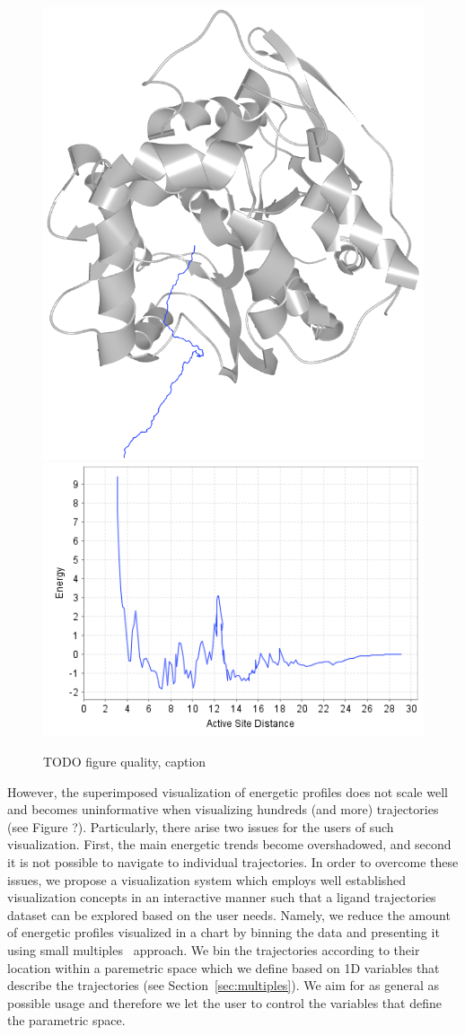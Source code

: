 \documentclass{vgtc}                          %
\begin{document}
\begin{figure}[htb]
  \centering
  \includegraphics[width=0.5\columnwidth]{trajectory}\\
  \vspace{1em}
  \includegraphics[width=0.8\columnwidth]{trajectory-energy}
  \caption{TODO figure quality, caption}
  \label{fig:trajectory}
\end{figure}

However, the superimposed visualization of energetic profiles does not scale well and becomes uninformative when visualizing hundreds (and more) trajectories (see Figure ?).
Particularly, there arise two issues for the users of such visualization. First, the main energetic trends become overshadowed, and second it is not possible to navigate to individual trajectories.
In order to overcome these issues, we propose a visualization system which employs well established visualization concepts in an interactive manner such that a ligand trajectories dataset can be explored based on the user needs.
Namely, we reduce the amount of energetic profiles visualized in a chart by binning the data and presenting it using small multiples~\cite{tufte1990envisioning} approach.
We bin the trajectories according to their location within a paremetric space which we define based on 1D variables that describe the trajectories (see Section~\ref{sec:multiples}).
We aim for as general as possible usage and therefore we let the user to control the variables that define the parametric space.
\end{document}
